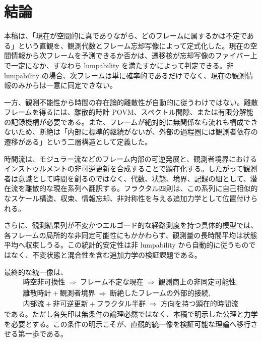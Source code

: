 \documentclass[a4paper,11pt]{ltjsarticle}
\theoremstyle{remark}
\begin{document}
\section{結論}

本稿は、「現在が空間的に真でありながら、どのフレームに属するかは不定である」という直観を、観測代数とフレーム忘却写像によって定式化した。現在の空間情報から次フレームを予測できるか否かは、遷移核が忘却写像のファイバー上で一定になか、すなわち lumpability を満たすかによって判定できる。非 lumpability の場合、次フレームは単に確率的であるだけでなく、現在の観測情報のみからは一意に同定できない。

一方、観測不能性から時間の存在論的離散性が自動的に従うわけではない。離散フレームを得るには、離散的時計 POVM、スペクトル間隙、または有限分解能の記録機構が必要である。また、フレームが絶対的に無関係なら流れも構成できないため、断絶は「内部に標準的継続がないが、外部の過程圏には観測者依存の遷移がある」という二層構造として定義した。

時間流は、モジュラー流などのフレーム内部の可逆発展と、観測者境界におけるインストゥルメントの非可逆更新を合成することで顕在化する。したがって観測者は意識として時間を創るのではなく、代数、状態、境界、記録の組として、潜在流を離散的な現在系列へ翻訳する。フラクタル四則は、この系列に自己相似的なスケール構造、収束、情報忘却、非対称性を与える追加力学として位置付けられる。

さらに、観測結果列が不変かつエルゴード的な経路測度を持つ具体的模型では、各フレームの局所的な非同定可能性にもかかわらず、観測量の長時間平均は状態平均へ収束しうる。この統計的安定性は非 lumpability から自動的に従うものではなく、不変状態と混合性を含む追加力学の検証課題である。

最終的な統一像は、
\begin{equation*}
 \boxed{
 \begin{gathered}
 \text{時空非可換性}
 \;\Rightarrow\;
 \text{フレーム不定な現在}
 \;\Rightarrow\;
 \text{観測商上の非同定可能性},\\
 \text{離散時計}+\text{観測者境界}
 \;\Rightarrow\;
 \text{断絶したフレームの外部的接続},\\
 \text{内部流}+\text{非可逆更新}+\text{フラクタル半群}
 \;\Rightarrow\;
 \text{方向を持つ顕在的時間流}
 \end{gathered}}
\end{equation*}
である。ただし各矢印は無条件の論理必然ではなく、本稿で明示した公理と力学を必要とする。この条件の明示こそが、直観的統一像を検証可能な理論へ移行させる第一歩である。
\end{document}
